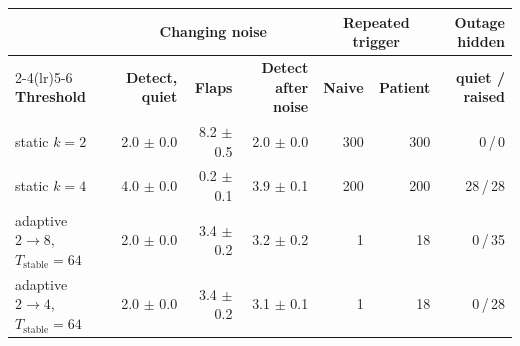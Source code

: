 \begin{tabular}{@{}lrrrrrr@{}}
\toprule
 & \multicolumn{3}{c}{\textbf{Changing noise}} & \multicolumn{2}{c}{\textbf{Repeated trigger}} & \textbf{Outage hidden} \\
\cmidrule(lr){2-4}\cmidrule(lr){5-6}
\textbf{Threshold} & \textbf{Detect, quiet} & \textbf{Flaps} & \textbf{Detect after noise} & \textbf{Naive} & \textbf{Patient} & \textbf{quiet / raised} \\
\midrule
static $k{=}2$ & 2.0 $\pm$ 0.0 & 8.2 $\pm$ 0.5 & 2.0 $\pm$ 0.0 & 300 & 300 & 0\,/\,0 \\
static $k{=}4$ & 4.0 $\pm$ 0.0 & 0.2 $\pm$ 0.1 & 3.9 $\pm$ 0.1 & 200 & 200 & 28\,/\,28 \\
adaptive $2\to8$, $T_{\text{stable}}{=}64$ & 2.0 $\pm$ 0.0 & 3.4 $\pm$ 0.2 & 3.2 $\pm$ 0.2 & 1 & 18 & 0\,/\,35 \\
adaptive $2\to4$, $T_{\text{stable}}{=}64$ & 2.0 $\pm$ 0.0 & 3.4 $\pm$ 0.2 & 3.1 $\pm$ 0.1 & 1 & 18 & 0\,/\,28 \\
\bottomrule
\end{tabular}
